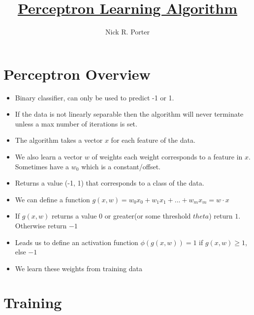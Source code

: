 \documentclass[11pt]{article}
\title{\textbf{\underline{Perceptron Learning Algorithm}}}
\author{Nick R. Porter}
\begin{document}
\maketitle

\section{Perceptron Overview}

\begin{itemize}
	\item Binary classifier, can only be used to predict -1 or 1.
	\item If the data is not linearly separable then the algorithm will never terminate unless a max number of iterations is set.
	\item The algorithm takes a vector $x$ for each feature of the data.
	\item We also learn a vector $w$ of weights each weight corresponds to a feature in $x$. Sometimes have a $w_0$ which is a constant/offset.
	\item Returns a value (-1, 1) that corresponds to a class of the data.
	\item We can define a function $g(x,w) = w_0x_0 + w_1x_1 + ... + w_mx_m = w \cdot x$
	\item If $g(x,w)$ returns a value $0$ or greater(or some threshold $theta$) return $1$. Otherwise return $-1$
	\item Leads us to define an activation function $\phi(g(x,w)) = 1$ if $g(x,w) \geq 1$, else $-1$
	\item We learn these weights from training data
	
\end{itemize}

\section{Training}
\end{document}
